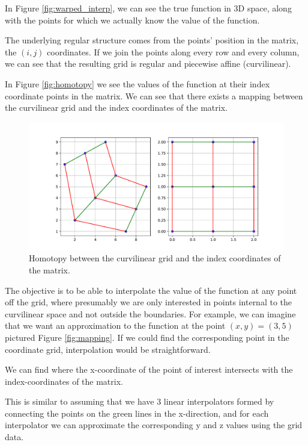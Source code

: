 \documentclass[\econtexRoot/SequentialEGM]{subfiles}
\begin{document}
In Figure \ref{fig:warped_interp}, we can see the true function in 3D space, along with the points for which we actually know the value of the function.

The underlying regular structure comes from the points' position in the matrix, the $(i,j)$ coordinates. If we join the points along every row and every column, we can see that the resulting grid is regular and piecewise affine (curvilinear).

In Figure \ref{fig:homotopy} we see the values of the function at their index coordinate points in the matrix. We can see that there exists a mapping between the curvilinear grid and the index coordinates of the matrix.

\begin{figure}
    \centering
    \includegraphics[width=0.8\linewidth]{Figures/Homotopy.pdf}
    \caption{Homotopy between the curvilinear grid and the index coordinates of the matrix.}
    \notinsubfile{\label{fig:homotopy}}
\end{figure}

The objective is to be able to interpolate the value of the function at any point off the grid, where presumably we are only interested in points internal to the curvilinear space and not outside the boundaries. For example, we can imagine that we want an approximation to the function at the point $(x,y) = (3, 5)$ pictured Figure \ref{fig:mapping}. If we could find the corresponding point in the coordinate grid, interpolation would be straightforward.

We can find where the x-coordinate of the point of interest intersects with the index-coordinates of the matrix.

This is similar to assuming that we have 3 linear interpolators formed by connecting the points on the green lines in the x-direction, and for each interpolator we can approximate the corresponding y and z values using the grid data.
\end{document}
